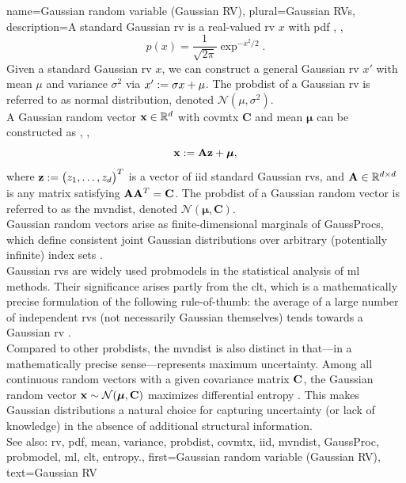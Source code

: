 {name={Gaussian random variable (Gaussian RV)}, 
	plural={Gaussian RVs}, 
	description={A  standard Gaussian \gls{rv} is a 
		real-valued \gls{rv} $x$ with \gls{pdf} \cite{BertsekasProb}, \cite{GrayProbBook}, \cite{papoulis}
		\begin{equation}
			\nonumber
			p(x) = \frac{1}{\sqrt{2\pi}} \exp^{-x^2/2}. 
		\end{equation}
		Given a standard Gaussian \gls{rv} $x$, we can construct a general Gaussian \gls{rv} $x'$ with 
		\gls{mean} $\mu$ and \gls{variance} $\sigma^2$ via $x' := \sigma x + \mu$. The \gls{probdist} of a 
		Gaussian \gls{rv} is referred to as normal distribution, denoted $\mathcal{N}(\mu, \sigma^2)$. 
		\\ 
		A Gaussian random vector ${\bf x} \in \mathbb{R}^{d}$ with 
		\gls{covmtx} $\mathbf{C}$ and \gls{mean} ${\bm \mu}$ can be constructed as \cite{GrayProbBook}, \cite{papoulis}, \cite{Lapidoth09}
		\[
		{\bf x} := \mathbf{A} {\bf z} + {\bm \mu},
		\]
		where ${\bf z} := \big( z_{1}, \ldots, z_{d} \big)^{T}$ is a vector of \gls{iid} standard Gaussian \glspl{rv}, 
		and ${\bf A} \in \mathbb{R}^{d \times d}$ is any matrix satisfying ${\bf A} {\bf A}^{T} = {\bf C}$. 
		The \gls{probdist} of a 
		Gaussian random vector is referred to as the \gls{mvndist}, denoted $\mathcal{N}({\bm \mu}, \mathbf{C})$.
		\\
		Gaussian random vectors arise as finite-dimensional marginals of \glspl{GaussProc}, which define 
		consistent joint Gaussian distributions over arbitrary (potentially infinite) index sets \cite{Rasmussen2006Gaussian}. 
  		\\
        		Gaussian \glspl{rv} are widely used \glspl{probmodel} in the statistical analysis of 
        		\gls{ml} methods. Their significance arises partly from the \gls{clt}, which is a mathematically 
        		precise formulation of the following rule-of-thumb: the average of a large number of 
        		independent \glspl{rv} (not necessarily Gaussian themselves) tends towards a Gaussian \gls{rv} \cite{ross2013first}.
		\\ 
		Compared to other \glspl{probdist}, the \gls{mvndist} is also distinct in that—in a mathematically 
		precise sense—represents maximum uncertainty. Among all continuous random vectors with 
		a given covariance matrix ${\bf C}$, the Gaussian random vector ${\bf x} \sim \mathcal{N}({\bm \mu}, \mathbf{C})$ 
		maximizes differential \gls{entropy} \cite[Th. 8.6.5]{coverthomas}. This makes Gaussian distributions a 
		natural choice for capturing uncertainty (or lack of knowledge) in the absence of additional 
		structural information.
		\\ 
		See also: \gls{rv}, \gls{pdf}, \gls{mean}, \gls{variance}, \gls{probdist}, \gls{covmtx}, \gls{iid}, \gls{mvndist}, \gls{GaussProc}, \gls{probmodel}, \gls{ml}, \gls{clt}, \gls{entropy}.},
	first={Gaussian random variable (Gaussian RV)},
	text={Gaussian RV}
}
	
